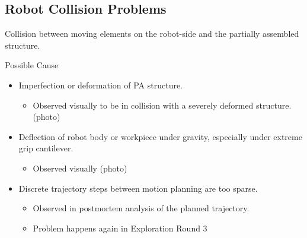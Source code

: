 \subsection{Robot Collision Problems}
\label{subsection:exploration-2-robot-collision-problems}

Collision between moving elements on the robot-side and the partially assembled structure.

Possible Cause
\begin{itemize}
    \item Imperfection or deformation of PA structure.
    \begin{itemize}
        \item Observed visually to be in collision with a severely deformed structure. (photo)
    \end{itemize}
    \item Deflection of robot body or workpiece under gravity, especially under extreme grip cantilever. 
    \begin{itemize}
        \item Observed visually (photo)
    \end{itemize}
    \item Discrete trajectory steps between motion planning are too sparse.
    \begin{itemize}
        \item Observed in postmortem analysis of the planned trajectory.
        \item Problem happens again in Exploration Round 3
    \end{itemize}
\end{itemize}


